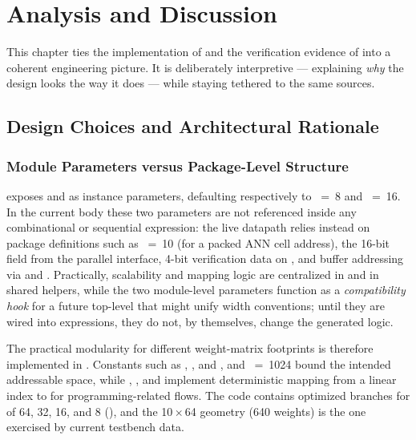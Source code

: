 
\chapter{Analysis and Discussion}
\label{ch:analysis}

This chapter ties the implementation of  and the verification
evidence of  into a coherent engineering picture. It is
deliberately interpretive --- explaining \emph{why} the design looks the
way it does --- while staying tethered to the same sources.

\section{Design Choices and Architectural Rationale}
\label{sec:analysis-choices}

\subsection{Module Parameters versus Package-Level Structure}
\label{sec:analysis-params}

 exposes  and 
as instance parameters, defaulting respectively to
~=~8 and
~=~16. In the current  body
these two parameters are not referenced inside any combinational or
sequential expression: the live datapath relies instead on package
definitions such as ~=~10 (for a packed ANN cell
address), the 16-bit  field from the parallel
interface, 4-bit verification data on , and
buffer addressing via  and
. Practically, scalability
and mapping logic are centralized in  and in shared
helpers, while the two module-level parameters function as a
\emph{compatibility hook} for a future top-level that might unify width
conventions; until they are wired into expressions, they do not, by
themselves, change the generated logic.

The practical modularity for different weight-matrix footprints is
therefore implemented in . Constants such as
, , 
and , and ~=~1024
bound the intended addressable space, while ,
, and 
implement deterministic mapping from a linear index to
 for programming-related flows. The
code contains optimized branches for  of 64, 32, 16,
and 8 (), and the 10\,\(\times\)\,64
geometry (640 weights) is the one exercised by current testbench data.

